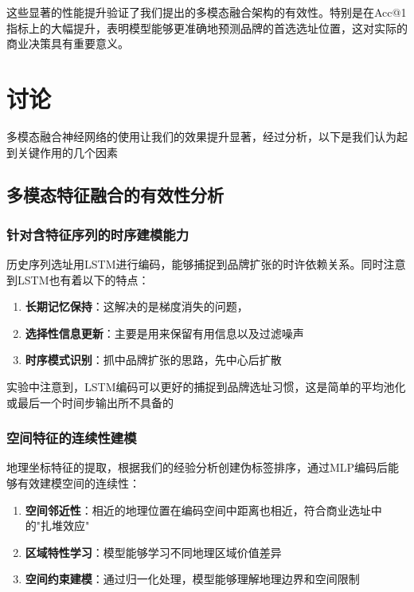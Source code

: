\documentclass{article}
\begin{document}
这些显著的性能提升验证了我们提出的多模态融合架构的有效性。特别是在Acc@1指标上的大幅提升，表明模型能够更准确地预测品牌的首选选址位置，这对实际的商业决策具有重要意义。

\section{讨论}

多模态融合神经网络的使用让我们的效果提升显著，经过分析，以下是我们认为起到关键作用的几个因素

\subsection{多模态特征融合的有效性分析}

\subsubsection{针对含特征序列的时序建模能力}

历史序列选址用LSTM进行编码，能够捕捉到品牌扩张的时许依赖关系。同时注意到LSTM也有着以下的特点：

\begin{enumerate}
\item \textbf{长期记忆保持}：这解决的是梯度消失的问题，
\item \textbf{选择性信息更新}：主要是用来保留有用信息以及过滤噪声
\item \textbf{时序模式识别}：抓中品牌扩张的思路，先中心后扩散
\end{enumerate}

实验中注意到，LSTM编码可以更好的捕捉到品牌选址习惯，这是简单的平均池化或最后一个时间步输出所不具备的

\subsubsection{空间特征的连续性建模}

地理坐标特征的提取，根据我们的经验分析创建伪标签排序，通过MLP编码后能够有效建模空间的连续性：

\begin{enumerate}
\item \textbf{空间邻近性}：相近的地理位置在编码空间中距离也相近，符合商业选址中的"扎堆效应"
\item \textbf{区域特性学习}：模型能够学习不同地理区域价值差异
\item \textbf{空间约束建模}：通过归一化处理，模型能够理解地理边界和空间限制
\end{enumerate}
\end{document}

